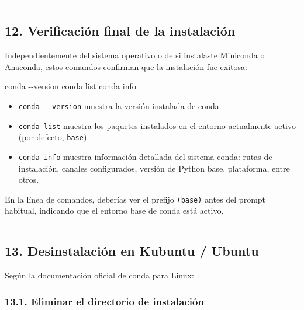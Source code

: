 \documentclass[
  doc,
  floatsintext,
  longtable,
  a4paper,
  nolmodern,
  notxfonts,
  notimes,
  12pt,
  colorlinks=true,linkcolor=blue,citecolor=blue,urlcolor=blue]{apa7}
\newenvironment{Shaded}{\begin{snugshade}}{\end{snugshade}}
\newcommand{\AttributeTok}[1]{\textcolor[rgb]{0.40,0.45,0.13}{#1}}
\newcommand{\ExtensionTok}[1]{\textcolor[rgb]{0.00,0.23,0.31}{#1}}
\newcommand{\NormalTok}[1]{\textcolor[rgb]{0.00,0.23,0.31}{#1}}
\providecommand{\tightlist}{%
  \setlength{\itemsep}{0pt}\setlength{\parskip}{0pt}}
\begin{document}
\begin{center}\rule{0.5\linewidth}{0.5pt}\end{center}

\subsection{12. Verificación final de la
instalación}\label{verificaciuxf3n-final-de-la-instalaciuxf3n}

Independientemente del sistema operativo o de si instalaste Miniconda o
Anaconda, estos comandos confirman que la instalación fue exitosa:

\begin{Shaded}
\begin{Highlighting}[]
\ExtensionTok{conda} \AttributeTok{{-}{-}version}
\ExtensionTok{conda}\NormalTok{ list}
\ExtensionTok{conda}\NormalTok{ info}
\end{Highlighting}
\end{Shaded}

\begin{itemize}
\tightlist
\item
  \texttt{conda\ -\/-version} muestra la versión instalada de conda.
\item
  \texttt{conda\ list} muestra los paquetes instalados en el entorno
  actualmente activo (por defecto, \texttt{base}).
\item
  \texttt{conda\ info} muestra información detallada del sistema conda:
  rutas de instalación, canales configurados, versión de Python base,
  plataforma, entre otros.
\end{itemize}

En la línea de comandos, deberías ver el prefijo \texttt{(base)} antes
del prompt habitual, indicando que el entorno base de conda está activo.

\begin{center}\rule{0.5\linewidth}{0.5pt}\end{center}

\subsection{13. Desinstalación en Kubuntu /
Ubuntu}\label{desinstalaciuxf3n-en-kubuntu-ubuntu}

Según la documentación oficial de conda para Linux:

\subsubsection{13.1. Eliminar el directorio de
instalación}\label{eliminar-el-directorio-de-instalaciuxf3n}
\end{document}
